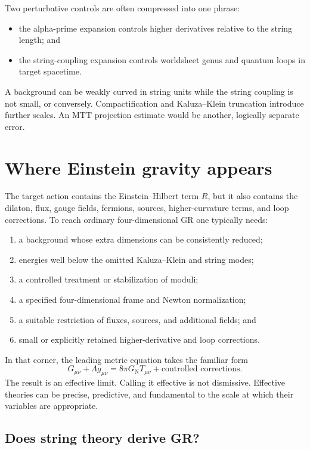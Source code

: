 \documentclass[11pt]{article}
\begin{document}
Two perturbative controls are often compressed into one phrase:
\begin{itemize}
\item the alpha-prime expansion controls higher derivatives relative to the
string length; and
\item the string-coupling expansion controls worldsheet genus and quantum
loops in target spacetime.
\end{itemize}
A background can be weakly curved in string units while the string coupling
is not small, or conversely.  Compactification and Kaluza--Klein truncation
introduce further scales.  An MTT projection estimate would be another,
logically separate error.

\section{Where Einstein gravity appears}

The target action contains the Einstein--Hilbert term \(R\), but it also
contains the dilaton, flux, gauge fields, fermions, sources, higher-curvature
terms, and loop corrections.  To reach ordinary four-dimensional GR one
typically needs:
\begin{enumerate}
\item a background whose extra dimensions can be consistently reduced;
\item energies well below the omitted Kaluza--Klein and string modes;
\item a controlled treatment or stabilization of moduli;
\item a specified four-dimensional frame and Newton normalization;
\item a suitable restriction of fluxes, sources, and additional fields; and
\item small or explicitly retained higher-derivative and loop corrections.
\end{enumerate}

In that corner, the leading metric equation takes the familiar form
\[
G_{\mu\nu}+\Lambda g_{\mu\nu}
=8\pi G_{\mathrm N}T_{\mu\nu}+\text{controlled corrections}.
\]
The result is an effective limit.  Calling it effective is not dismissive.
Effective theories can be precise, predictive, and fundamental to the scale
at which their variables are appropriate.

\subsection{Does string theory derive GR?}
\end{document}

